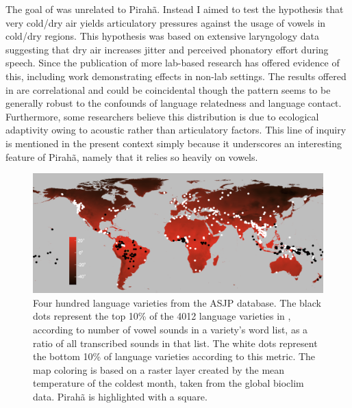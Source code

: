 \documentclass[output=paper,colorlinks,citecolor=brown
]{langscibook}
\begin{document}
    The goal of \cite{everett2017languages} was unrelated to Pirahã. Instead I aimed to test the hypothesis that very cold/dry air yields articulatory pressures against the usage of vowels in cold/dry regions. This hypothesis was based on extensive laryngology data suggesting that dry air increases jitter and perceived phonatory effort during speech. Since the publication of \cite{everett2017languages} more lab-based research has offered evidence of this, including work demonstrating effects in non-lab settings.\cite{alves2019effect} The results offered in \cite{everett2017languages} are correlational and could be coincidental though the pattern seems to be generally robust to the confounds of language relatedness and language contact. Furthermore, some researchers believe this distribution is due to ecological adaptivity owing to acoustic rather than articulatory factors.\cite{maddieson2018language} This line of inquiry is mentioned in the present context simply because it underscores an interesting feature of Pirahã, namely that it relies so heavily on vowels.


\begin{figure}
\centering
\includegraphics[width=1\textwidth]{everett_figure4.png}
\caption{\label{fig:Figure 4}Four hundred language varieties from the ASJP database. The black dots represent the top 10\% of the 4012 language varieties in \cite{everett2017languages}, according to number of vowel sounds in a variety’s word list, as a ratio of all transcribed sounds in that list. The white dots represent the bottom 10\% of language varieties according to this metric. The map coloring is based on a raster layer created by the mean temperature of the coldest month, taken from the global bioclim data.\cite{noce2020new} Pirahã is highlighted with a square.}

\end{figure}
\end{document}
